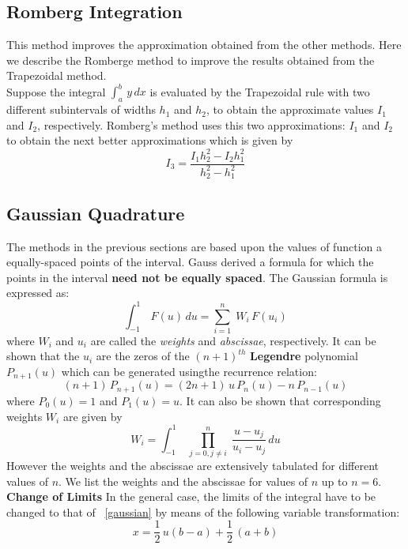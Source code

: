 \documentclass[aima203_lecturenotes_ku.tex]{subfiles}
\begin{document}
\subsection{Romberg Integration}
This method improves the approximation obtained from the other methods. Here we describe the Romberge method to improve the results obtained from the Trapezoidal method. \\[2mm]
Suppose the integral $\displaystyle \int_a^b \, y\,dx$ is evaluated by the Trapezoidal rule with two different subintervals of widths $h_1$ and $h_2$, to obtain the approximate values $I_1$ and $I_2$, respectively. Romberg's method uses this two approximations: $I_1$ and $I_2$ to obtain the next better approximations which is given by
\begin{equation}
  \label{romberg}
I_3 = \frac{I_1h_2^2-I_2h_1^2}{h_2^2 - h_1^2}
\end{equation}

\subsection{Gaussian Quadrature}
The methods in the previous sections are based upon the values of function a equally-spaced points of the interval. Gauss derived a formula for which the points in the interval \textbf{need not be equally spaced}.
The Gaussian formula is expressed as:
\begin{equation}
  \label{gaussian}
\int_{-1}^{1} \, F(u)\, du = \sum_{i=1}^n \; W_i\, F(u_i)
\end{equation}
where $W_i$ and $u_i$ are called the \textit{weights} and \textit{abscissae}, respectively. It can be shown that the $u_i$ are the zeros of the $(n+1)^{th}$ \textbf{Legendre} polynomial $P_{n+1}(u)$ which can be generated usingthe recurrence relation:
\begin{equation*}
  (n+1)\,P_{n+1}(u) = (2n+1)\,u\,P_{n}(u) -n\,P_{n-1}(u)
\end{equation*}
where $P_0(u)=1$ and $P_1(u)=u$. It can also be shown that corresponding weights $W_i$ are given by
\begin{equation*}
  W_i =\int_{-1}^{1}\; \prod_{j=0, j\neq i}^n \; \frac{u-u_j}{u_i - u_j}\, du
\end{equation*}
However the weights and the abscissae are extensively tabulated for different values of $n$. We list the weights and the abscissae for values of $n$ up to $n=6$. \\[1mm]
\textbf{Change of Limits}
In the general case, the limits of the integral have to be changed to that of ~\ref{gaussian} by means of the following variable transformation:
\begin{equation*}
  x = \frac{1}{2} \, u(b-a) + \frac{1}{2}\, (a+b)
\end{equation*}
\end{document}
